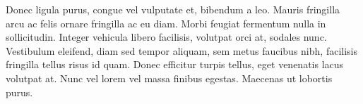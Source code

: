 \documentclass{article}
\begin{document}
Donec ligula purus, congue vel vulputate et, bibendum a leo. Mauris fringilla arcu ac felis ornare fringilla ac eu diam. Morbi feugiat fermentum nulla in sollicitudin. Integer vehicula libero facilisis, volutpat orci at, sodales nunc. Vestibulum eleifend, diam sed tempor aliquam, sem metus faucibus nibh, facilisis fringilla tellus risus id quam. Donec efficitur turpis tellus, eget venenatis lacus volutpat at. Nunc vel lorem vel massa finibus egestas. Maecenas ut lobortis purus.
\end{document}
